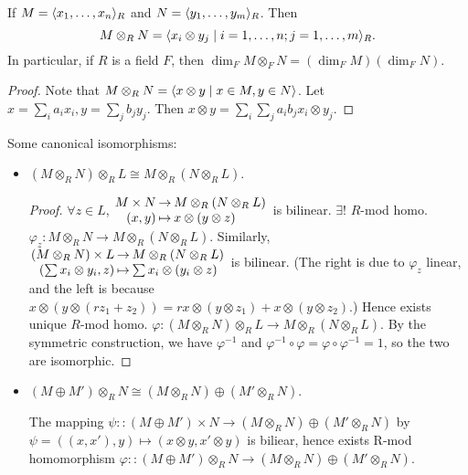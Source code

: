 \begin{prop}
  If $M = \langle x_1, \dots, x_n\rangle_R$ and $N = \langle y_1, \dots, y_m\rangle_R$. Then
  \[ M \otimes_R N = \langle x_i \otimes y_j \mid i = 1, \dots, n;
  j = 1, \dots, m\rangle_R. \]
  In particular, if $R$ is a field $F$, then
  $\dim_F M\otimes_F N = (\dim_F M)(\dim_F N)$.
  \begin{proof}
    Note that $M \otimes_R N = \langle x \otimes y \mid x \in M, y \in N\rangle$.
    Let $x = \sum_i a_ix_i, y = \sum_j b_jy_j$. Then
    $x\otimes y = \sum_i \sum_j a_ib_j x_i \otimes y_j$.
  \end{proof}
\end{prop}

Some canonical isomorphisms:
\begin{itemize}
  \item $(M \otimes_R N) \otimes_R L \cong M \otimes_R (N \otimes_R L)$.
    \begin{proof}
      $\forall z \in L$, 
      $\arraycolsep=1pt
      \begin{array}{rcl}
        M \times N & \to & M \otimes_R (N \otimes_R L) \\
        (x, y) & \mapsto & x \otimes (y \otimes z)
      \end{array}$ is bilinear.
      $\exists!$ $R$-mod homo.
      $\varphi_z: M \otimes_R N \to M\otimes_R(N\otimes_R L)$.
      Similarly,
      $\arraycolsep=1pt
      \begin{array}{rcl}
        (M \otimes_R N) \times L & \to & M \otimes_R (N \otimes_R L) \\
        \left(\sum x_i\otimes y_i, z\right) & \mapsto &
        \sum x_i \otimes (y_i \otimes z)
      \end{array}$ is bilinear. (The right is due to $\varphi_z$ linear, and 
      the left is because $x \otimes (y \otimes (rz_1 + z_2)) = rx \otimes (y \otimes z_1) + 
      x \otimes (y \otimes z_2)$.)
      Hence exists unique $R$-mod homo.
      $\varphi: (M \otimes_R N) \otimes_R L \to M \otimes_R (N \otimes_R L)$.
      By the symmetric construction, we have $\varphi^{-1}$ and $\varphi^{-1} \circ 
      \varphi = \varphi \circ \varphi^{-1} = 1$, so the two are isomorphic.
    \end{proof}
  \item $(M \oplus M') \otimes_R N \cong (M \otimes_R N)\oplus(M'\otimes_R N)$.

    The mapping $\psi :: (M \oplus M') \times N \to (M \otimes_R N)\oplus(M'\otimes_R N)$
    by $\psi = ((x, x'), y) \mapsto (x\otimes y, x'\otimes y)$ is biliear, hence 
    exists R-mod homomorphism $\varphi :: (M \oplus M') \otimes_R N \to (M \otimes_R N)\oplus(M'\otimes_R N)$.


\end{itemize}
